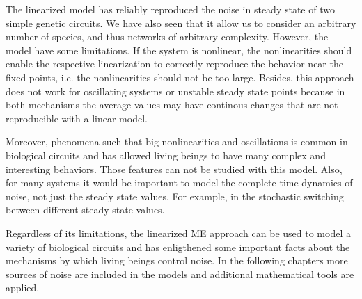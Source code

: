 The linearized model has reliably reproduced the noise in steady state of two simple genetic circuits. We have also seen that it allow us to consider an arbitrary number of species, and thus networks of arbitrary complexity. However, the model have some limitations. If the system is nonlinear, the nonlinearities should enable the respective linearization to correctly reproduce the behavior near the fixed points, i.e. the nonlinearities should not be too large. Besides, this approach does not work for oscillating systems or unstable steady state points because in both mechanisms the average values may have continous changes that are not reproducible with a linear model.

Moreover, phenomena such that big nonlinearities and oscillations is common in biological circuits and has allowed living beings to have many complex and interesting behaviors. Those features can not be studied with this model. Also, for many systems it would be important to model the complete time dynamics of noise, not just the steady state values. For example, in the stochastic switching between different steady state values.

Regardless of its limitations, the linearized ME approach can be used to model a variety of biological circuits and has enligthened some important facts about the mechanisms by which living beings control noise. In the following chapters more sources of noise are included in the models and additional mathematical tools are applied.
